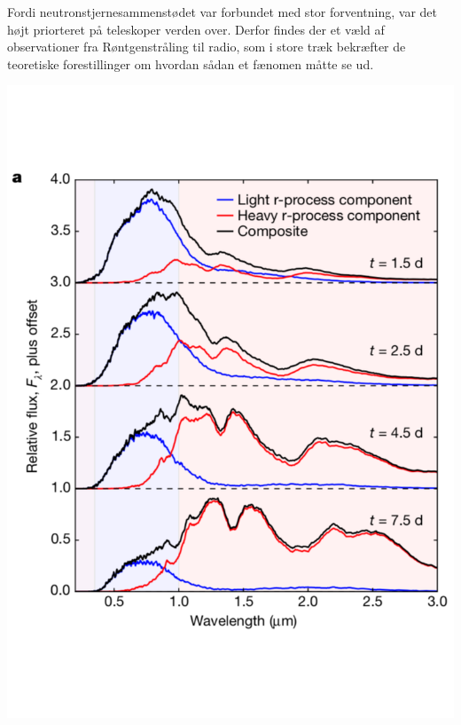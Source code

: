 \documentclass[twocolumn]{article}
\begin{document}
Fordi neutronstjernesammenstødet var forbundet med stor forventning, var det højt priorteret på teleskoper verden over. Derfor findes der et væld af observationer fra Røntgenstråling til radio, som i store træk bekræfter de teoretiske forestillinger om hvordan sådan et fænomen måtte se ud. 


\begin{center}
\includegraphics[width=\columnwidth]{kasen_kn} \label{kasen}
\end{center}
\end{document}
